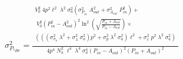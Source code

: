 


\begin{eqnarray*}
  \sigma_{P_{^3He}}^2 = \frac{
\begin{array}{c}
	V_0^2\;4 p^2\ell^2\;\lambda^2\;\sigma_a^2
			\left(\sigma_{P_{in}}^2\;A_{out}^2 + \sigma_{A_{out}}^2\;P_{in}^2 \right) + \\
	\;V_0^2\left(P_{in}^2 - A_{out}^2\right)^2 \ln^2\left(\sqrt{\frac{P_{in} + A_{out}}{P_{in}-A_{out}}} \right) \times \\
	\left(\left(\left(\sigma_{\sigma_a}^2\;\lambda^2 + \sigma_\lambda^2\;\sigma_a^2\right) p^2 + \sigma_p^2\;\lambda^2\;\sigma_a^2\right) \ell^2 + \sigma_\ell^2\;p^2\;\lambda^2\;\sigma_a^2\right)\\
	\end{array}
	}{4 p^4\;N_a^2\;\ell^4\;\lambda^4\;\sigma_a^4 \left(P_{in} - A_{out}\right)^2 \left( P_{in} + A_{out}\right)^2}
\end{eqnarray*}

